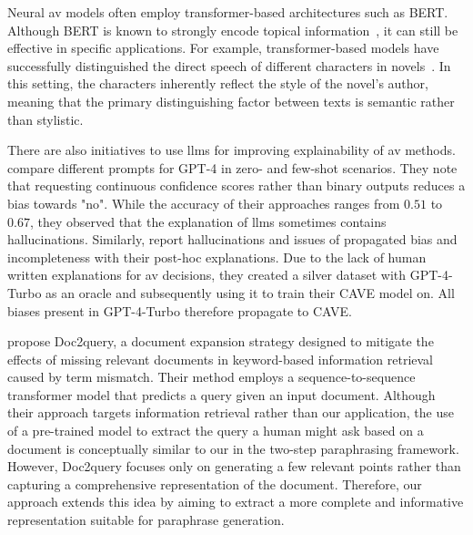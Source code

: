 Neural \ac{av} models often employ transformer-based architectures such as BERT. 
Although BERT is known to strongly encode topical information~\citep{sawatphol_cross-topic_av_24}, it can still be effective in specific applications. 
For example, transformer-based models have successfully distinguished the direct speech of different characters in novels~\citep{michel_fictional_2024}. 
In this setting, the characters inherently reflect the style of the novel’s author, meaning that the primary distinguishing factor between texts is semantic rather than stylistic.

There are also initiatives to use \acp{llm} for improving explainability of \ac{av} methods.
\citet{hung_xai_av_llm_2023} compare different prompts for GPT-4 in zero- and few-shot scenarios.
They note that requesting continuous confidence scores rather than binary outputs reduces a bias towards "no".
While the accuracy of their approaches ranges from $0.51$ to $0.67$, they observed that the explanation of \acp{llm} sometimes contains hallucinations.
Similarly, \citet{ramnath_cave_xai_llm_2025} report hallucinations and issues of propagated bias and incompleteness with their post-hoc explanations.
Due to the lack of human written explanations for \ac{av} decisions, they created a silver dataset with GPT-4-Turbo as an oracle and subsequently using it to train their CAVE model on.
All biases present in GPT-4-Turbo therefore propagate to CAVE.

\citet{nogueira_doc2query_2019} propose Doc2query, a document expansion strategy designed to mitigate the effects of missing relevant documents in keyword-based information retrieval caused by term mismatch. 
Their method employs a sequence-to-sequence transformer model that predicts a query given an input document. 
Although their approach targets information retrieval rather than our application, the use of a pre-trained model to extract the query a human might ask based on a document is conceptually similar to our \pextractor{} in the two-step paraphrasing framework. 
However, Doc2query focuses only on generating a few relevant points rather than capturing a comprehensive representation of the document. 
Therefore, our approach extends this idea by aiming to extract a more complete and informative representation suitable for paraphrase generation.

